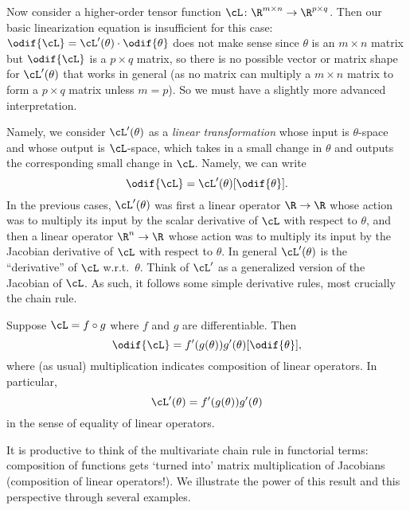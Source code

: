 \documentclass[../../book-main.tex]{subfiles}
\begin{document}
Now consider a higher-order tensor function \(\cL \colon \R^{m \times n} \to \R^{p \times q}\). Then our basic linearization equation is insufficient for this case: \(\odif{\cL} = \cL^{\prime}(\theta) \cdot \odif{\theta}\) does not make sense since \(\theta\) is an \(m \times n\) matrix but \(\odif{\cL}\) is a \(p \times q\) matrix, so there is no possible vector or matrix shape for \(\cL^{\prime}(\theta)\) that works in general (as no matrix can multiply a \(m \times n\) matrix to form a \(p \times q\) matrix unless \(m = p\)). So we must have a slightly more advanced interpretation. 

Namely, we consider \(\cL^{\prime}(\theta)\) as a \textit{linear transformation} whose input is \(\theta\)-space and whose output is \(\cL\)-space, which takes in a small change in \(\theta\) and outputs the corresponding small change in \(\cL\). Namely, we can write 
\begin{equation}
    \odif{\cL} = \cL^{\prime}(\theta)[\odif{\theta}].
\end{equation}
In the previous cases, \(\cL^{\prime}(\theta)\) was first a linear operator \(\R \to \R\) whose action was to multiply its input by the scalar derivative of \(\cL\) with respect to \(\theta\), and then a linear operator \(\R^{n} \to \R\) whose action was to multiply its input by the Jacobian derivative of \(\cL\) with respect to \(\theta\). In general \(\cL^{\prime}(\theta)\) is the ``derivative'' of \(\cL\) w.r.t.~\(\theta\). 
Think of \(\cL^{\prime}\) as a generalized version of the Jacobian of \(\cL\).
As such, it follows some simple derivative rules, most crucially the chain rule.

\begin{theorem}
    Suppose \(\cL = f \circ g\) where \(f\) and \(g\) are differentiable. Then 
    \begin{equation}
        \odif{\cL} = f^{\prime}(g(\theta))g^{\prime}(\theta)[\odif{\theta}],
    \end{equation}
    where (as usual) multiplication indicates composition of linear operators. In particular,
    \begin{equation}
        \cL^{\prime}(\theta) = f^{\prime}(g(\theta))g^{\prime}(\theta)
    \end{equation}
    in the sense of equality of linear operators. 
\end{theorem}

It is productive to think of the multivariate chain rule in functorial terms:
composition of functions gets `turned into' matrix multiplication of Jacobians
(composition of linear operators!).
We illustrate the power of this result and this perspective through several
examples.
\end{document}
